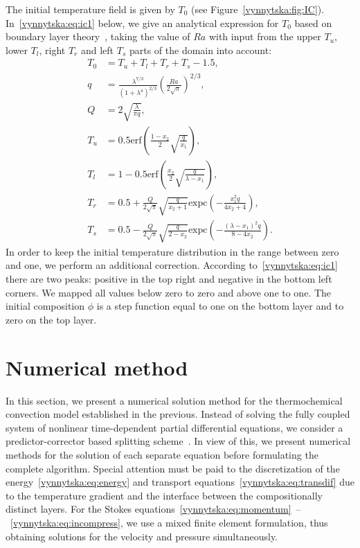 The initial temperature field is given by $T_0$ (see
Figure~\ref{vynnytska:fig:IC}).  In~\eqref{vynnytska:eq:ic1} below,
we give an analytical expression for $T_0$ based on boundary layer
theory~\citep{KekenEtAl1997}, taking the value of $Ra$ with input from
the upper $T_u$, lower $T_l$, right $T_r$ and left $T_s$ parts of the
domain into account:
\begin{subequations}
  \label{vynnytska:eq:ic1}
  \begin{align}
    T_0 &= T_u + T_l + T_r + T_s - 1.5,
\\
  q &= \frac{\lambda^{7/3}}{\left(1 + \lambda^4 \right)^{2/3}} \left( \frac{Ra}{2 \sqrt{\pi}}\right)^{2/3},
\\
  Q & = 2\sqrt{\frac{\lambda}{\pi q}},
\\
    T_u &= 0.5 \mathrm{erf} \left( \frac{1-x_2}{2} \sqrt{\frac{q}{x_1}  } \right),
\\
    T_l &= 1 - 0.5 \mathrm{erf} \left( \frac{x_2}{2} \sqrt{\frac{q}{\lambda - x_1}  } \right),
\\
    T_r &= 0.5 + \frac{Q}{2\sqrt{\pi}} \sqrt{\frac{q}{x_{2} + 1} } \mathrm{expc} \left( - \frac{x_1^2 q}{4 x_2 + 4} \right),
\\
    T_s &= 0.5 - \frac{Q}{2\sqrt{\pi}} \sqrt{\frac{q}{2 - x_{2}} } \mathrm{expc} \left( - \frac{ \left(\lambda - x_1 \right)^2  q}{8 - 4 x_2} \right).
  \end{align}
\end{subequations}
In order to keep the initial temperature distribution in the range
between zero and one, we perform an additional correction. According
to~\eqref{vynnytska:eq:ic1} there are two peaks: positive in the top
right and negative in the bottom left corners. We mapped all values
below zero to zero and above one to one. The initial composition
$\phi$ is a step function equal to one on the bottom layer and to zero
on the top layer.


\section{Numerical method}

In this section, we present a numerical solution method for the
thermochemical convection model established in the previous. Instead
of solving the fully coupled system of nonlinear time-dependent partial
differential equations, we consider a predictor-corrector based splitting
scheme~\citep{BergKekenYuen1993, HansenEbel1988}. In view of this, we
present numerical methods for the solution of each separate equation
before formulating the complete algorithm. Special attention must be
paid to the discretization of the energy~\eqref{vynnytska:eq:energy}
and transport equations~\eqref{vynnytska:eq:transdif}
due to the temperature gradient and the interface
between the compositionally distinct layers. For the Stokes
equations~\eqref{vynnytska:eq:momentum}~--~\eqref{vynnytska:eq:incompress},
we use a mixed finite element formulation, thus obtaining solutions for
the velocity and pressure simultaneously.


